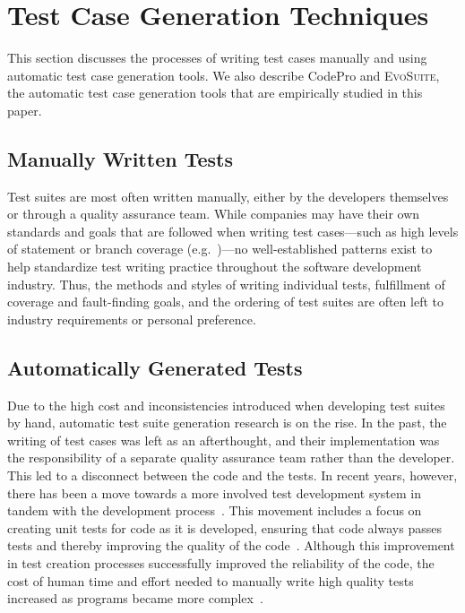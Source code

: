 
\section{Test Case Generation Techniques}
\label{sec:background}

This section discusses the processes of writing test cases manually and using automatic test case generation tools.  We also describe CodePro and \textsc{EvoSuite}, the automatic test case generation tools that are empirically studied in this paper.

\subsection{Manually Written Tests}

Test suites are most often written manually, either by the developers themselves or through a quality assurance team.  While companies may have their own standards and goals that are followed when writing test cases---such as high levels of statement or branch coverage (e.g.~\cite{DO-178B, IEC61508})---no well-established patterns exist to help standardize test writing practice throughout the software development industry. Thus, the methods and styles of writing individual tests, fulfillment of coverage and fault-finding goals, and the ordering of test suites are often left to industry requirements or personal preference.  

\subsection{Automatically Generated Tests}

Due to the high cost and inconsistencies introduced when developing test suites by hand, automatic test suite generation research is on the rise.  In the past, the writing of test cases was left as an afterthought, and their implementation was the responsibility of a separate quality assurance team rather than the developer.  This led to a disconnect between the code and the tests.  In recent years, however, there has been a move towards a more involved test development system in tandem with the development process~\cite{Gelperin:1988:GST:62959.62965}.  This movement includes a focus on creating unit tests for code as it is developed, ensuring that code always passes tests and thereby improving the quality of the code~\cite{Canfora:2006:EAT:1159733.1159788}.  Although this improvement in test creation processes successfully improved the reliability of the code, the cost of human time and effort needed to manually write high quality tests increased as programs became more complex~\cite{clarke1998automated}. 

